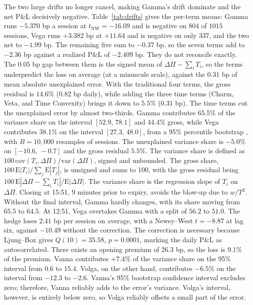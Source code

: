 \documentclass[11pt]{article}
\begin{document}
The two large drifts no longer cancel, making Gamma's drift dominate and the net P\&L decisively negative. Table~\ref{tab:drifts} gives the per-term means: Gamma runs $-5.370$ bp a session at $t_{\mathrm{NW}} = -16.09$ and is negative on $804$ of $1015$ sessions, Vega runs $+3.382$ bp at $+11.64$ and is negative on only $337$, and the two net to $-1.99$ bp. The remaining five sum to $-0.37$ bp, so the seven terms add to $-2.36$ bp against a realized P\&L of $-2.409$ bp.
They do not reconcile exactly. The $0.05$ bp gap between them is the signed mean of $\Delta\Pi - \sum_i T_i$, so the terms underpredict the loss on average (at a minuscule scale), against the $0.31$ bp of mean absolute unexplained error. With the traditional four terms, the gross residual is $14.6\%$ ($0.82$ bp daily), while adding the three time terms (Charm, Veta, and Time Convexity) brings it down to $5.5\%$ ($0.31$ bp). The time terms cut the unexplained error by almost two-thirds.
Gamma contributes 65.5\% of the variance share on the interval $[52.9,\,78.1]$ and 44.4\% gross, while Vega contributes 38.1\% on the interval $[27.3,\,48.0]$, from a 95\% percentile bootstrap \cite{efron1979}, with $B = 10{,}000$ resamples of
sessions. The unexplained variance share is $-5.0\%$ on $[-10.6,\,-0.7]$ and the gross residual $5.5\%$. The variance share is defined as $100\,\mathrm{cov}(T_i,\Delta\Pi)/\mathrm{var}(\Delta\Pi)$, signed and unbounded. The gross share, $100\,\mathrm{E}|T_i|/\sum_j \mathrm{E}|T_j|$, is unsigned and sums to 100, with the gross residual being $100\,\mathrm{E}|\Delta\Pi - \sum_i T_i|/\mathrm{E}|\Delta\Pi|$. The variance share is the regression slope of $T_i$ on $\Delta\Pi$.
Closing at 15:51, 9 minutes prior to expiry, avoids the blow-up due to $w/T^{2}$. Without the final interval, Gamma hardly changes, with its share moving from $65.5$ to $64.5$. At 12:51, Vega overtakes Gamma with a split of $56.2$ to $51.0$.
The hedge loses $2.41$ bp per session on average, with a Newey--West $t = -8.87$ at lag six, against $-10.49$ without the correction. The correction is necessary because Ljung--Box \cite{ljungbox1978} gives $Q(10) = 35.58$, $p = 0.0001$, marking the daily P\&L as autocorrelated.
There exists an opening premium of 26.3 bp, so the loss is 9.1\% of the premium. Vanna contributes $+7.4\%$ of the variance share on the 95\% interval from $0.6$ to $15.4$. Volga, on the other hand, contributes $-6.5\%$ on the interval from $-12.3$ to $-2.6$. Vanna's 95\% bootstrap confidence interval excludes zero; therefore, Vanna reliably adds to the error's variance. Volga's interval, however, is entirely below zero, so Volga reliably offsets a small part of the error.
\end{document}
